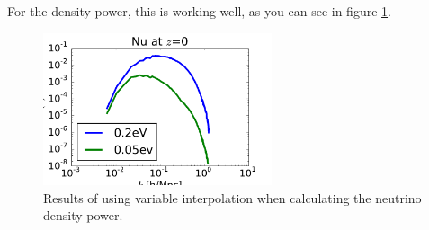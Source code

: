 \documentclass[superscriptaddress,prd]{revtex4}
\begin{document}
For the density power, this is working well, as you can see in figure
\ref{fig:varinterp_den}.

\begin{figure}
  \centering
  \caption{Results of using variable interpolation when calculating
    the neutrino density power.}\label{fig:varinterp_den}
  \includegraphics[width=0.6\textwidth]{Figures/density_nu_variable_interpolation.pdf}
\end{figure}
\end{document}
